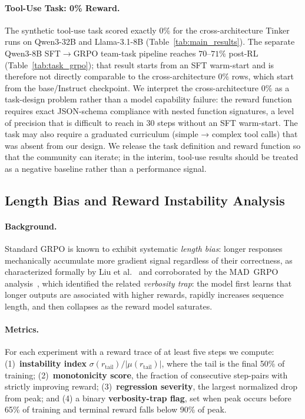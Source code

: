\documentclass{article}
\begin{document}
\paragraph{Tool-Use Task: 0\% Reward.}
The synthetic tool-use task scored exactly $0\%$ for the
cross-architecture Tinker runs on Qwen3-32B and Llama-3.1-8B
(Table~\ref{tab:main_results}). The separate Qwen3-8B SFT$\to$GRPO
team-task pipeline reaches $70$--$71\%$ post-RL
(Table~\ref{tab:task_grpo}); that result starts from an SFT warm-start
and is therefore not directly comparable to the cross-architecture
$0\%$ rows, which start from the base/Instruct checkpoint. We
interpret the cross-architecture $0\%$ as a task-design problem
rather than a model capability failure: the reward function requires
exact JSON-schema compliance with nested function signatures, a
level of precision that is difficult to reach in 30 steps without
an SFT warm-start.
The task may also require a graduated curriculum (simple → complex tool calls)
that was absent from our design. We release the task definition and reward
function so that the community can iterate; in the interim, tool-use results
should be treated as a negative baseline rather than a performance signal.

\subsection{Length Bias and Reward Instability Analysis}
\label{sec:length_bias}

\paragraph{Background.}
Standard GRPO is known to exhibit systematic \emph{length bias}: longer responses
mechanically accumulate more gradient signal regardless of their correctness,
as characterized formally by Liu et al.~\cite{liu2025drgrpo} and corroborated
by the MAD~GRPO analysis~\cite{wang2025madgrpo}, which identified the related
\emph{verbosity trap}: the model first learns that longer outputs are associated
with higher rewards, rapidly increases sequence length, and then collapses as
the reward model saturates.

\paragraph{Metrics.}
For each experiment with a reward trace of at least five steps we compute:
(1)~\textbf{instability index} $\sigma(r_{\text{tail}}) / |\mu(r_{\text{tail}})|$,
where the tail is the final 50\% of training;
(2)~\textbf{monotonicity score}, the fraction of consecutive step-pairs with
strictly improving reward;
(3)~\textbf{regression severity}, the largest normalized drop from peak;
and (4) a binary \textbf{verbosity-trap flag}, set when peak occurs before 65\%
of training and terminal reward falls below 90\% of peak.
\end{document}
